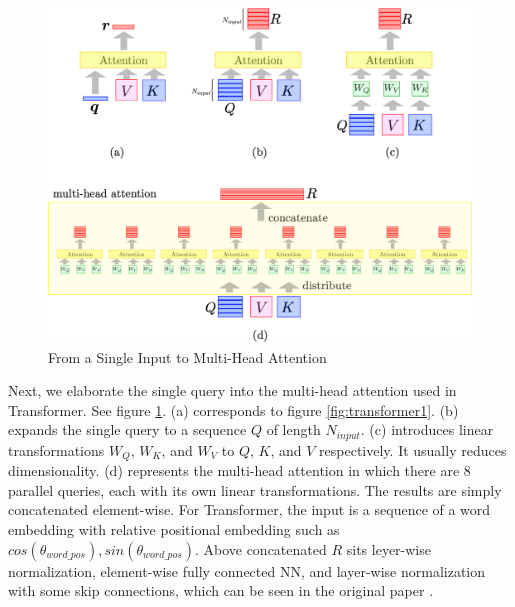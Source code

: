 \documentclass[a4]{article}
\begin{document}
\begin{figure}[!htb]
\centering
\includegraphics[width=12cm]{transformer2.png}
\caption{From a Single Input to Multi-Head Attention}
\label{fig:transformer2}
\end{figure}

Next, we elaborate the single query into the multi-head attention used in Transformer.
See figure \ref{fig:transformer2}. (a) corresponds to figure \ref{fig:transformer1}.
(b) expands the single query to a sequence $Q$ of length $N_{input}$. (c) introduces linear
transformations $W_Q$, $W_K$, and $W_V$ to $Q$, $K$, and $V$ respectively. It usually reduces
dimensionality. (d) represents the multi-head attention in which there are 8 parallel queries,
each with its own linear transformations. The results are simply concatenated element-wise.
For Transformer, the input is a sequence of a word embedding with relative positional embedding
such as $cos(\theta_{word\_pos}), sin(\theta_{word\_pos})$. Above concatenated $R$ sits 
leyer-wise normalization, element-wise fully connected NN, and layer-wise normalization with
some skip connections, which can be seen in the original paper \cite{transformer}.

{}

\end{document}
